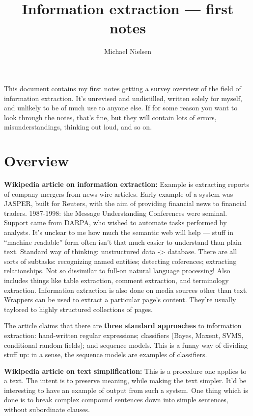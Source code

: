 
\title{Information extraction --- first notes}
\author{Michael Nielsen}



\maketitle

This document contains my first notes getting a survey overview of the
field of information extraction.  It's unrevised and undistilled,
written solely for myself, and unlikely to be of much use to anyone
else.  If for some reason you want to look through the notes, that's
fine, but they will contain lots of errors, misunderstandings,
thinking out loud, and so on.

\section{Overview}

\textbf{Wikipedia article on information extraction:} Example is
extracting reports of company mergers from news wire articles.  Early
example of a system was JASPER, built for Reuters, with the aim of
providing financial news to financial traders.  1987-1998: the Message
Understanding Conferences were seminal.  Support came from DARPA, who
wished to automate tasks performed by analysts.  It's unclear to me
how much the semantic web will help --- stuff in ``machine readable''
form often isn't that much easier to understand than plain text.
Standard way of thinking: unstructured data -> database.  There are
all sorts of subtasks: recognizing named entities; detecting
coferences; extracting relationships.  Not so dissimilar to full-on
natural language processing! Also includes things like table
extraction, comment extraction, and terminology extraction.
Information extraction is also done on media sources other than text.
Wrappers can be used to extract a particular page's content.  They're
usually taylored to highly structured collections of pages.

The article claims that there are \textbf{three standard approaches}
to information extraction: hand-written regular expressions;
classifiers (Bayes, Maxent, SVMS, conditional random fields); and
sequence models.  This is a funny way of dividing stuff up: in a
sense, the sequence models are examples of classifiers.  

\textbf{Wikipedia article on text simplification:} This is a procedure
one applies to a text.  The intent is to preserve meaning, while
making the text simpler.  It'd be interesting to have an example of
output from such a system.  One thing which is done is to break
complex compound sentences down into simple sentences, without
subordinate clauses.

